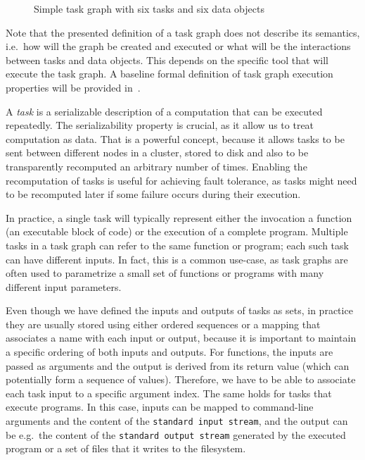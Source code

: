 \begin{figure}[h]
	\centering
	\caption{Simple task graph with six tasks and six data objects}
	\label{fig:task-graph-example}
\end{figure}

Note that the presented definition of a task graph does not describe its semantics, i.e.\ how will
the graph be created and executed or what will be the interactions between tasks and data objects.
This depends on the specific tool that will execute the task graph. A baseline formal definition of
task graph execution properties will be provided in~.

A \emph{task} is a serializable description of a computation that can be executed
repeatedly. The serializability property is crucial, as it allow us to treat computation as data.
That is a powerful concept, because it allows tasks to be sent between different nodes in a
cluster, stored to disk and also to be transparently recomputed an arbitrary number of times.
Enabling the recomputation of tasks is useful for achieving fault tolerance, as tasks might need to
be recomputed later if some failure occurs during their execution.

In practice, a single task will typically represent either the invocation a function (an executable
block of code) or the execution of a complete program. Multiple tasks in a task graph can refer to
the same function or program; each such task can have different inputs. In fact, this is a common
use-case, as task graphs are often used to parametrize a small set of functions or programs with
many different input parameters.

Even though we have defined the inputs and outputs of tasks as sets, in practice they are usually
stored using either ordered sequences or a mapping that associates a name with each input or
output, because it is important to maintain a specific ordering of both inputs and outputs. For
functions, the inputs are passed as arguments and the output is derived from its return value
(which can potentially form a sequence of values). Therefore, we have to be able to associate each
task input to a specific argument index. The same holds for tasks that execute programs. In this
case, inputs can be mapped to command-line arguments and the content of the \texttt{standard input stream},
and the output can be e.g.\ the content of the \texttt{standard output stream} generated by the executed
program or a set of files that it writes to the filesystem.

